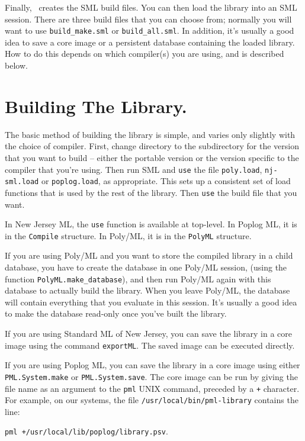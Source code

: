 Finally, \install\ creates the SML build files.  You can then load
the library into an SML session.  There are three build files that
you can choose from; normally you will want to use {\tt build\_make.sml}
or {\tt build\_all.sml}.  In addition, it's usually a good idea to
save a core image or a persistent database containing the loaded
library.  How to do this depends on which compiler(s) you are using,
and is described below.


\section{Building The Library.}

The basic method of building the library is simple, and varies only
slightly with the choice of compiler.  First, change directory to the
subdirectory for the version that you want to build -- either
the portable version or the version specific to the compiler
that you're using.  Then run SML and {\tt use} the file {\tt poly.load},
{\tt nj-sml.load} or {\tt poplog.load}, as appropriate.  This sets
up a consistent set of load functions that is used by the rest of
the library.  Then {\tt use} the build file that you want.

In New Jersey ML, the {\tt use} function is available at top-level.
In Poplog ML, it is in the {\tt Compile} structure. In Poly/ML, it is
in the {\tt PolyML} structure.

If you are using Poly/ML and you want to store the compiled library
in a child database, you have to create the database in one Poly/ML
session, (using the function {\tt PolyML.make\_database}), and then run
Poly/ML again with this database to actually build the library.  When you
leave Poly/ML, the database will contain everything that you evaluate
in this session. It's usually a good idea to make the database read-only
once you've built the library.

If you are using Standard ML of New Jersey, you can save the library
in a core image using the command {\tt exportML}.  The saved image can
be executed directly.

If you are using Poplog ML, you can save the library in a core image
using either {\tt PML.System.make} or {\tt PML.System.save}.  The core image
can be run by giving the file name as an argument to the {\tt pml}
{\small UNIX} command, preceded by a \verb-+- character.  For example,
on our systems, the file {\tt /usr/local/bin/pml-library} contains
the line:

{\tt pml +/usr/local/lib/poplog/library.psv}.


